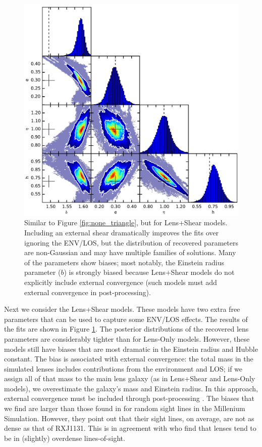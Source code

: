 \documentclass{emulateapj}
\begin{document}
\begin{figure}[ht]
\begin{center}
\includegraphics[width=1\textwidth]{all_shear_1e-2.pdf}
\caption{\label{fig:shear_triangle} Similar to Figure \ref{fig:none_triangle}, but for Lens+Shear models. Including an external shear dramatically improves the fits over ignoring the ENV/LOS, but the distribution of recovered parameters are non-Gaussian and may have multiple families of solutions. Many of the parameters show biases; most notably, the Einstein radius parameter ($b$) is strongly biased because Lens+Shear models do not explicitly include external convergence (such models must add external convergence in post-processing).  
}
\end{center}
\end{figure}

Next we consider the Lens+Shear models. These models have two extra free parameters that can be used to capture some ENV/LOS effects. The results of the fits are shown in Figure \ref{fig:shear_triangle}. The posterior distributions of the recovered lens parameters are considerably tighter than for Lens-Only models. However, these models still have biases that are most dramatic in the Einstein radius and Hubble constant. The bias is associated with external convergence: the total mass in the simulated lenses includes contributions from the environment and LOS; if we assign all of that mass to the main lens galaxy (as in Lens+Shear and Lens-Only models), we overestimate the galaxy's mass and Einstein radius.  In this approach, external convergence must be included through post-processing \citep{Collett13, Suyu10}. The biases that we find are larger than those found in \citet{Jaroszynski16} for random sight lines in the Millenium Simulation. However, they point out that their sight lines, on average, are not as dense as that of RXJ1131. This is in agreement with \citet{Collett16} who find that lenses tend to be in (slightly) overdense lines-of-sight.
\end{document}

